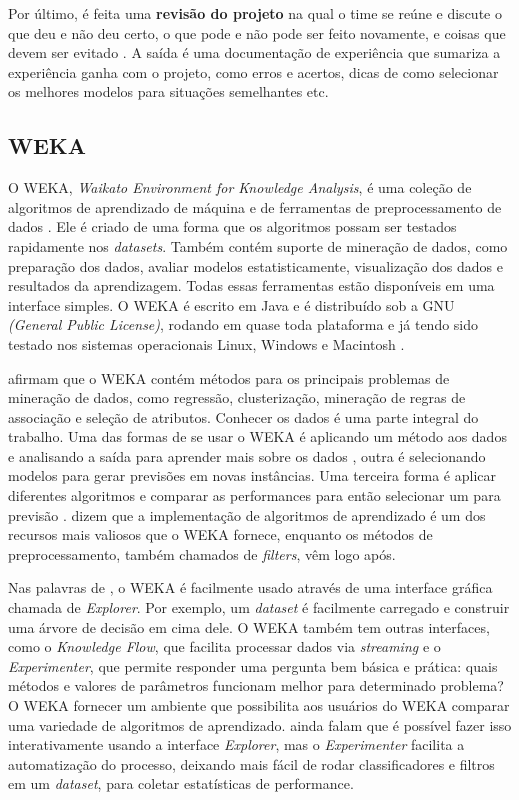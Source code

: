 Por último, é feita uma \textbf{revisão do projeto} na qual o time se reúne e discute o que deu e não deu certo, o que pode e não pode ser feito novamente, e coisas que devem ser evitado \citep{dmfd}.
A saída é uma documentação de experiência que sumariza a experiência ganha com o projeto, como erros e acertos, dicas de como selecionar os melhores modelos para situações semelhantes etc.

\subsection{WEKA}

O WEKA, \textit{Waikato Environment for Knowledge Analysis}, é uma coleção de algoritmos de aprendizado de máquina e de ferramentas de preprocessamento de dados \citep{weka}. Ele é criado de uma forma que os algoritmos possam ser testados rapidamente nos \textit{datasets}. Também contém suporte de mineração de dados, como preparação dos dados, avaliar modelos estatisticamente, visualização dos dados e resultados da aprendizagem. Todas essas ferramentas estão disponíveis em uma interface simples. O WEKA é escrito em Java e é distribuído sob a GNU \textit{(General Public License)}, rodando em quase toda plataforma e já tendo sido testado nos sistemas operacionais Linux, Windows e Macintosh \citep{weka}.

 afirmam que o WEKA contém métodos para os principais problemas de mineração de dados, como regressão, clusterização, mineração de regras de associação e seleção de atributos. Conhecer os dados é uma parte integral do trabalho. Uma das formas de se usar o WEKA é aplicando um método aos dados e analisando a saída para aprender mais sobre os dados \citep{weka}, outra é selecionando modelos para gerar previsões em novas instâncias. Uma terceira forma é aplicar diferentes algoritmos e comparar as performances para então selecionar um para previsão .  dizem que a implementação de algoritmos de aprendizado é um dos recursos mais valiosos que o WEKA fornece, enquanto os métodos de preprocessamento, também chamados de \textit{filters}, vêm logo após. 

Nas palavras de , o WEKA é facilmente usado através de uma interface gráfica chamada de \textit{Explorer}. Por exemplo, um \textit{dataset} é facilmente carregado e construir uma árvore de decisão em cima dele. O WEKA também tem outras interfaces, como o \textit{Knowledge Flow}, que facilita processar dados via \textit{streaming} e o \textit{Experimenter}, que permite responder uma pergunta bem básica e prática: quais métodos e valores de parâmetros funcionam melhor para determinado problema? O WEKA fornecer um ambiente que possibilita aos usuários do WEKA comparar uma variedade de algoritmos de aprendizado.  ainda falam que é possível fazer isso interativamente usando a  interface \textit{Explorer}, mas o \textit{Experimenter} facilita a automatização do processo, deixando mais fácil de rodar classificadores e filtros em um \textit{dataset}, para coletar estatísticas de performance.

